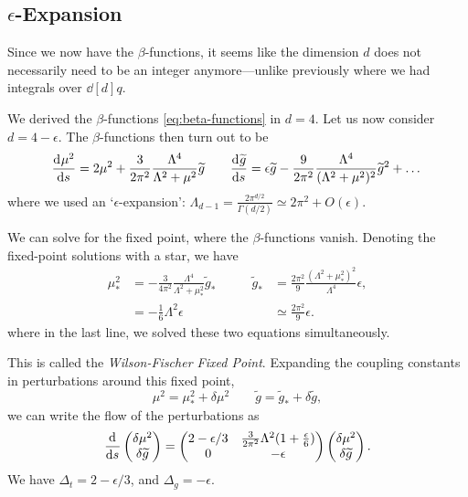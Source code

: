 \subsection{\texorpdfstring{$\epsilon$-}{Epsilon }Expansion}%
\label{sub:epsilon_expansion}

Since we now have the $\beta$-functions, it seems like the dimension $d$ does not necessarily need to be an integer anymore---unlike previously where we had integrals over $\dd[d]{q}$.

We derived the $\beta$-functions \eqref{eq:beta-functions} in $d = 4$. Let us now consider $d = 4 - \epsilon$. The $\beta$-functions then turn out to be 
\begin{equation}
  \dv[]{\mu^2}{s} = 2 \mu^2 + \frac{3}{2\pi^2} \frac{\Lambda^4}{\Lambda^2+\mu^2}\widetilde{g} \qquad \dv[]{\widetilde{g}}{s} = \epsilon \widetilde{g} - \frac{9}{2\pi^2} \frac{\Lambda^4}{(\Lambda^2+ \mu^2)^2} \widetilde{g}^2 + \dots
\end{equation}
where we used an `$\epsilon$-expansion': $\Lambda_{d-1} = \frac{2\pi^{d/2}}{\Gamma(d/2)} \simeq 2 \pi^2 + O(\epsilon)$.

We can solve for the fixed point, where the $\beta$-functions vanish.
Denoting the fixed-point solutions with a star, we have
\begin{align}
  \mu^2_* &= -\frac{3}{4\pi^2} \frac{\Lambda^4}{\Lambda^2 + \mu_*^2} \widetilde{g}_* \qquad &\widetilde{g}_* &= \frac{2\pi^2}{9} \frac{(\Lambda^2 + \mu_*^2)^2}{\Lambda^4} \epsilon, \\
	  &= - \frac{1}{6}\Lambda^2 \epsilon & &\simeq \frac{2\pi^2}{9} \epsilon.
\end{align}
where in the last line, we solved these two equations simultaneously.

This is called the \emph{Wilson-Fischer Fixed Point}.
Expanding the coupling constants in perturbations around this fixed point,
\begin{equation}
  \mu^2 = \mu_*^2 + \delta\mu^2 \qquad \widetilde{g} = \widetilde{g}_* + \delta \widetilde{g},
\end{equation}
we can write the flow of the perturbations as
\begin{equation}
  \dv[]{}{s}
  \begin{pmatrix}
  \delta \mu^2 \\
  \delta \widetilde{g} \\
  \end{pmatrix}
  =
  \begin{pmatrix}
    2 - \epsilon/3 &  \frac{3}{2\pi^2} \Lambda^2 (1 + \frac{\epsilon}{6}) \\
   0 & -\epsilon \\
  \end{pmatrix}
  \begin{pmatrix}
  \delta\mu^2 \\
  \delta \widetilde{g} \\
  \end{pmatrix}.
\end{equation}
We have $\Delta_t = 2 - \epsilon/3$, and $\Delta_g = -\epsilon$.

